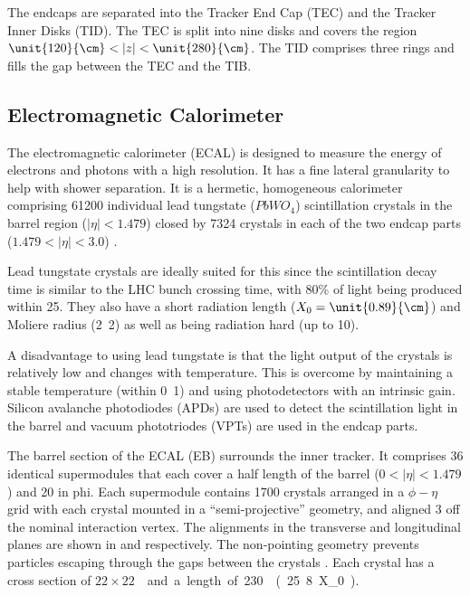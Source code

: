 The endcaps are separated into the Tracker End Cap (TEC) and the Tracker Inner
Disks (TID). The TEC is split into nine disks and covers the region
$\unit{120}{\cm} < |z| < \unit{280}{\cm}$. The TID comprises three rings
and fills the gap between the TEC and the TIB.


\subsection{Electromagnetic Calorimeter}
The electromagnetic calorimeter (ECAL) is designed to measure the energy of
electrons and photons with a high resolution.  It has a fine lateral granularity
to help with shower separation.  It is a hermetic, homogeneous calorimeter
comprising 61200 individual lead tungstate ($PbWO_{4}$) scintillation crystals
in the barrel region ($|\eta|<1.479$) closed by 7324 crystals in each of the two
endcap parts ($1.479<|\eta|<3.0$) \cite{ecal1997technical}.

Lead tungstate crystals are ideally suited for this since the scintillation
decay time is similar to the LHC bunch crossing time, 
with \unit{80}{\%} of light being produced within \unit{25}{\ns}.
They also have a short radiation length ($X_0=\unit{0.89}{\cm}$) 
and Moliere radius (\unit{2.2}{\cm}) as well as being radiation hard
(up to \unit{10}{\mrad}).

A disadvantage to using lead tungstate is that the light output of the crystals
is relatively low and changes with temperature. This is overcome by maintaining
a stable temperature (within \unit{0.1}{\degreecelsius}) and using
photodetectors with an intrinsic gain.
Silicon avalanche photodiodes (APDs) are used to detect the scintillation light
in the barrel and vacuum phototriodes (VPTs) are used in the endcap parts.

The barrel section of the ECAL (EB) surrounds the inner tracker. It comprises 36
identical supermodules that each cover a half length of the barrel
($0<|\eta|<1.479$) and \unit{20}{\degree} in phi. Each supermodule contains 1700
crystals arranged in a $\phi - \eta$ grid with each crystal mounted in a
``semi-projective'' geometry, and aligned \unit{3}{\degree} off the nominal
interaction vertex.  The alignments in the transverse and longitudinal planes
are shown in  and 
respectively. The non-pointing geometry prevents particles escaping through the
gaps between the crystals \cite{ecal1997technical}.  Each crystal has a
cross section of \unit{$22 \times 22$}{\mm\squared} and a length of
\unit{230}{\mm} (\unit{25.8}{X_0}).

